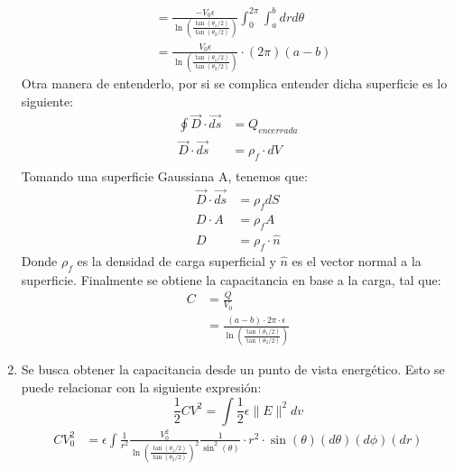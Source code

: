 \documentclass[
  11pt,
  letterpaper,
   addpoints,
   answers
  ]{exam}
\begin{document}
\begin{questions}
\begin{solution}
\begin{enumerate}
\begin{equation}
\begin{aligned}
              &=  \frac{-V_{0}\epsilon}{\ln\left(\frac{\tan(\theta_{1}/2)}{\tan(\theta_{2}/2)}\right)} \int_{0}^{2\pi} \int_{a}^{b} dr d\theta \\
              &=  \frac{V_{0}\epsilon}{\ln\left(\frac{\tan(\theta_{1}/2)}{\tan(\theta_{2}/2)}\right)} \cdot(2\pi)(a-b)
        \end{aligned}
    \end{equation}
    Otra manera de entenderlo, por si se complica entender dicha superficie es lo siguiente:
    \begin{align}
        \oint \Vec{D} \cdot \Vec{ds} &= Q_{encerrada} \\
        \Vec{D} \cdot \Vec{ds} &= \rho_{f} \cdot dV \\
    \end{align}
    Tomando una superficie Gaussiana A, tenemos que:
    \begin{align}
        \Vec{D} \cdot \Vec{ds} &= \rho_{f} dS \\
        D \cdot A &= \rho_{f} A\\
        D &= \rho_{f} \cdot \hat{n}
    \end{align}
    Donde $\rho_{f}$ es la densidad de carga superficial y $\hat{n}$ es el vector normal a la superficie. Finalmente se obtiene la capacitancia en base a la carga, tal que:
    \begin{equation}
        \begin{aligned}
            C &= \frac{Q}{V_{0}} \\
              &= \frac{(a-b)  \cdot 2\pi \cdot \epsilon}{\ln\left(\frac{\tan(\theta_{1}/2)}{\tan(\theta_{2}/2)}\right)}
        \end{aligned}
    \end{equation}
    \item Se busca obtener la capacitancia desde un punto de vista energético. Esto se puede relacionar con la siguiente expresión:
    \begin{equation}
        \frac{1}{2}C V^{2} = \int \frac{1}{2}\epsilon \|E\|^{2} dv
    \end{equation}
    \begin{equation}
        \begin{aligned}
            CV_{0}^{2} &= \epsilon \int \frac{1}{r^{2}}  \frac{V_{0}^{2}}{\ln\left(\frac{\tan(\theta_{1}/2)}{\tan(\theta_{2}/2)}\right)^{2}}\frac{1}{\sin^{2}(\theta)} \cdot r^{2} \cdot \sin(\theta) (d\theta) (d\phi) (dr)
        \end{aligned}
    \end{equation}

\end{enumerate}
\end{solution}
\end{questions}
\end{document}
